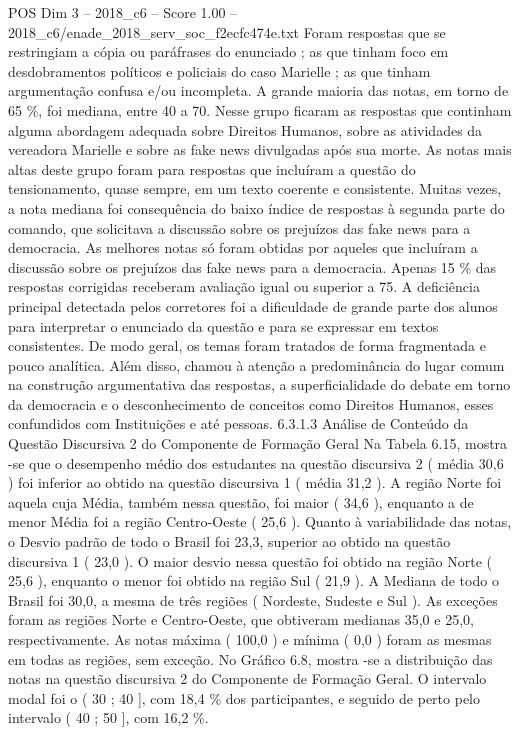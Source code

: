 \begin{textsample}{POS Dim 3 – 2018\_c6 – Score 1.00 – 2018\_c6/enade\_2018\_serv\_soc\_f2ecfc474e.txt}
Foram respostas que se restringiam a cópia ou paráfrases do enunciado ; as que tinham foco em desdobramentos políticos e policiais do caso Marielle ; as que tinham argumentação confusa e/ou incompleta.
A grande maioria das notas, em torno de 65 \%, foi mediana, entre 40 a 70.
Nesse grupo ficaram as respostas que continham alguma abordagem adequada sobre Direitos Humanos, sobre as atividades da vereadora Marielle e sobre as fake news divulgadas após sua morte.
As notas mais altas deste grupo foram para respostas que incluíram a questão do tensionamento, quase sempre, em um texto coerente e consistente.
Muitas vezes, a nota mediana foi consequência do baixo índice de respostas à segunda parte do comando, que solicitava a discussão sobre os prejuízos das fake news para a democracia.
As melhores notas só foram obtidas por aqueles que incluíram a discussão sobre os prejuízos das fake news para a democracia.
Apenas 15 \% das respostas corrigidas receberam avaliação igual ou superior a 75.
A deficiência principal detectada pelos corretores foi a dificuldade de grande parte dos alunos para interpretar o enunciado da questão e para se expressar em textos consistentes.
De modo geral, os temas foram tratados de forma fragmentada e pouco analítica.
Além disso, chamou à atenção a predominância do lugar comum na construção argumentativa das respostas, a superficialidade do debate em torno da democracia e o desconhecimento de conceitos como Direitos Humanos, esses confundidos com Instituições e até pessoas. 6.3.1.3 Análise de Conteúdo da Questão Discursiva 2 do Componente de Formação Geral Na Tabela 6.15, mostra -se que o desempenho médio dos estudantes na questão discursiva 2 ( média 30,6 ) foi inferior ao obtido na questão discursiva 1 ( média 31,2 ).
A região Norte foi aquela cuja Média, também nessa questão, foi maior ( 34,6 ), enquanto a de menor Média foi a região Centro-Oeste ( 25,6 ).
Quanto à variabilidade das notas, o Desvio padrão de todo o Brasil foi 23,3, superior ao obtido na questão discursiva 1 ( 23,0 ).
O maior desvio nessa questão foi obtido na região Norte ( 25,6 ), enquanto o menor foi obtido na região Sul ( 21,9 ).
A Mediana de todo o Brasil foi 30,0, a mesma de três regiões ( Nordeste, Sudeste e Sul ).
As exceções foram as regiões Norte e Centro-Oeste, que obtiveram medianas 35,0 e 25,0, respectivamente.
As notas máxima ( 100,0 ) e mínima ( 0,0 ) foram as mesmas em todas as regiões, sem exceção.
No Gráfico 6.8, mostra -se a distribuição das notas na questão discursiva 2 do Componente de Formação Geral.
O intervalo modal foi o ( 30 ; 40 ], com 18,4 \% dos participantes, e seguido de perto pelo intervalo ( 40 ; 50 ], com 16,2 \%.

\end{textsample}

